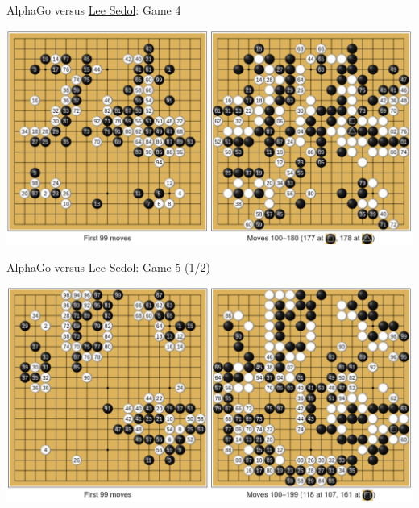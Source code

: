 \documentclass{beamer}
\begin{document}
{    \begin{frame}{{\color{black}AlphaGo} versus {\color{white}\underline{Lee Sedol}}: Game 4}
      \begin{center}
        \includegraphics[width=\textwidth]{../img/AlphaGo_vs_Lee_Sedol_Game_4.png}
      \end{center}
    \end{frame}

    \begin{frame}{{\color{white}\underline{AlphaGo}} versus {\color{black}Lee Sedol}: Game 5 (1/2)}
      \begin{center}
        \includegraphics[width=\textwidth]{../img/AlphaGo_vs_Lee_Sedol_Game_5a.png}
      \end{center}
    \end{frame}

}
\end{document}
